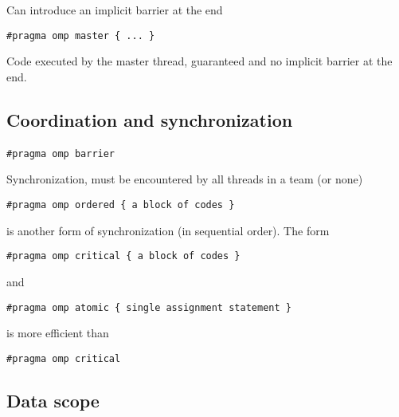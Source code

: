 \documentclass[%
oneside,                 %
final,                   %
10pt]{article}
\begin{document}
Can introduce an implicit barrier at the end
\begin{verbatim}
#pragma omp master { ... }
\end{verbatim}
Code executed by the master thread, guaranteed and no implicit barrier at the end.




\subsection*{Coordination and synchronization}

\paragraph{}
\begin{verbatim}
#pragma omp barrier
\end{verbatim}
Synchronization, must be encountered by all threads in a team (or none)
\begin{verbatim}
#pragma omp ordered { a block of codes }
\end{verbatim}
is another form of synchronization (in sequential order).
The form
\begin{verbatim}
#pragma omp critical { a block of codes }
\end{verbatim}
and 
\begin{verbatim}
#pragma omp atomic { single assignment statement }
\end{verbatim}
is  more efficient than 
\begin{verbatim}
#pragma omp critical
\end{verbatim}




\subsection*{Data scope}
\end{document}
